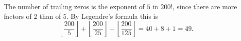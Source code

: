 The number of trailing zeros is the exponent of $5$ in $200!$, since there are more factors of $2$ than of $5$. By Legendre's formula this is
\[\left\lfloor\dfrac{200}{5}\right\rfloor+\left\lfloor\dfrac{200}{25}\right\rfloor+\left\lfloor\dfrac{200}{125}\right\rfloor=40+8+1=\boxed{49}.\]
